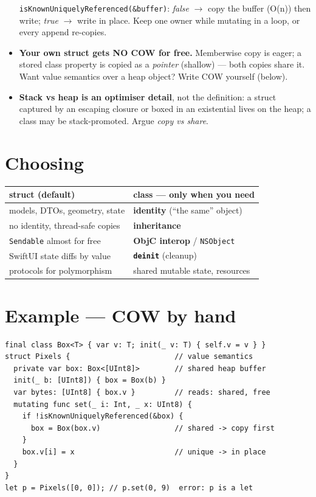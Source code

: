\documentclass[8pt]{extarticle}
\begin{document}
\begin{multicols}{2}
\begin{itemize}
        \texttt{isKnownUniquelyReferenced(\&buffer)}: \emph{false} $\to$ copy the
        buffer (O(n)) then write; \emph{true} $\to$ write in place. Keep one
        owner while mutating in a loop, or every append re-copies.
  \item \textbf{Your own struct gets NO COW for free.} Memberwise copy is eager;
        a stored class property is copied as a \emph{pointer} (shallow) — both
        copies share it. Want value semantics over a heap object? Write COW
        yourself (below).
  \item \textbf{Stack vs heap is an optimiser detail}, not the definition: a
        struct captured by an escaping closure or boxed in an existential lives
        on the heap; a class may be stack-promoted. Argue \emph{copy vs share}.
\end{itemize}

\section{Choosing}
{\footnotesize
\setlength{\tabcolsep}{3pt}
\begin{tabular}{@{}p{36mm}p{38mm}@{}}
\toprule
\textbf{struct (default)} & \textbf{class — only when you need} \\
\midrule
models, DTOs, geometry, state & \textbf{identity} (``the same'' object) \\
no identity, thread-safe copies & \textbf{inheritance} \\
\texttt{Sendable} almost for free & \textbf{ObjC interop} / \texttt{NSObject} \\
SwiftUI state diffs by value & \textbf{\texttt{deinit}} (cleanup) \\
protocols for polymorphism & shared mutable state, resources \\
\bottomrule
\end{tabular}}

\section{Example — COW by hand}
\begin{lstlisting}[language=SwiftSheet]
final class Box<T> { var v: T; init(_ v: T) { self.v = v } }
struct Pixels {                        // value semantics
  private var box: Box<[UInt8]>        // shared heap buffer
  init(_ b: [UInt8]) { box = Box(b) }
  var bytes: [UInt8] { box.v }         // reads: shared, free
  mutating func set(_ i: Int, _ x: UInt8) {
    if !isKnownUniquelyReferenced(&box) {
      box = Box(box.v)                 // shared -> copy first
    }
    box.v[i] = x                       // unique -> in place
  }
}
let p = Pixels([0, 0]); // p.set(0, 9)  error: p is a let
\end{lstlisting}


\end{multicols}
\end{document}
